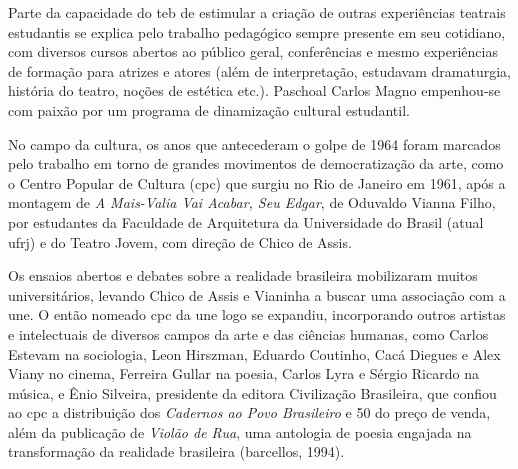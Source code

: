 \subject{Efervescência política e cultural dos anos 1960}

Parte da capacidade do {\sc teb} de estimular a criação de outras experiências
teatrais estudantis se explica pelo trabalho pedagógico sempre presente
em seu cotidiano, com diversos cursos abertos ao público geral,
conferências e mesmo experiências de formação para atrizes e atores
(além de interpretação, estudavam dramaturgia, história do teatro,
noções de estética etc.). Paschoal Carlos Magno empenhou-se com paixão
por um programa de dinamização cultural estudantil.

No campo da cultura, os anos que antecederam o golpe de 1964 foram
marcados pelo trabalho em torno de grandes movimentos de democratização
da arte, como o Centro Popular de Cultura ({\sc cpc}) que surgiu no Rio de
Janeiro em 1961, após a montagem de {\it A Mais-Valia Vai Acabar, Seu
Edgar}, de Oduvaldo Vianna Filho, por estudantes da Faculdade de
Arquitetura da Universidade do Brasil (atual {\sc ufrj}) e do Teatro Jovem,
com direção de Chico de Assis.

Os ensaios abertos e debates sobre a realidade brasileira mobilizaram
muitos universitários, levando Chico de Assis e Vianinha a buscar uma
associação com a {\sc une}. O então nomeado {\sc cpc} da {\sc une} logo se expandiu,
incorporando outros artistas e intelectuais de diversos campos da arte e
das ciências humanas, como Carlos Estevam na sociologia, Leon Hirszman,
Eduardo Coutinho, Cacá Diegues e Alex Viany no cinema, Ferreira Gullar
na poesia, Carlos Lyra e Sérgio Ricardo na música, e Ênio Silveira,
presidente da editora Civilização Brasileira, que confiou ao {\sc cpc} a
distribuição dos {\it Cadernos ao Povo Brasileiro} e 50
do preço de venda, além da publicação de {\it Violão de Rua}, uma
antologia de poesia engajada na transformação da realidade brasileira
({\sc barcellos}, 1994).

